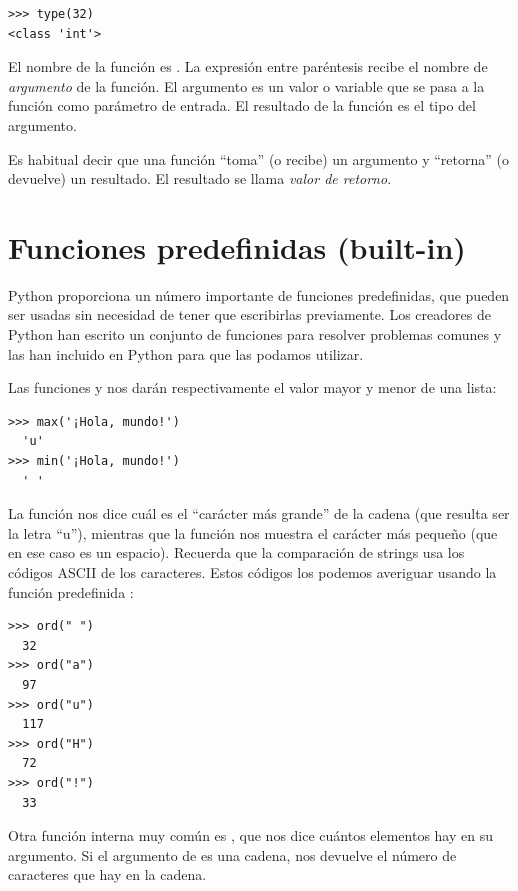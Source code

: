 \begin{Verbatim}[frame=single]
>>> type(32)
<class 'int'>
\end{Verbatim}

El nombre de la función es . La expresión entre paréntesis
recibe el nombre de \emph{argumento} de la función. El argumento es un
valor o variable que se pasa a la función como parámetro de entrada. El
resultado de la función  es el tipo del argumento.


Es habitual decir que una función ``toma'' (o recibe) un argumento y
``retorna'' (o devuelve) un resultado. El resultado se llama \emph{valor
de retorno}.

 

\section{Funciones predefinidas (built-in)}\label{funciones-predefinidad}

Python proporciona un número importante de funciones predefinidas, que
pueden ser usadas sin necesidad de tener que escribirlas previamente. Los
creadores de Python han escrito un conjunto de funciones para resolver
problemas comunes y las han incluido en Python para que las podamos
utilizar.

Las funciones  y  nos darán respectivamente el
valor mayor y menor de una lista:

\begin{Verbatim}[frame=single]
>>> max('¡Hola, mundo!')
  'u'
>>> min('¡Hola, mundo!')
  ' '
\end{Verbatim}

La función  nos dice cuál es el ``carácter más grande'' de
la cadena (que resulta ser la letra ``u''), mientras que la función
 nos muestra el carácter más pequeño (que en ese caso es un
espacio). Recuerda que la comparación de strings usa los códigos ASCII de los caracteres. Estos códigos los podemos averiguar usando la función predefinida :

\begin{Verbatim}[frame=single]
>>> ord(" ")
  32
>>> ord("a")
  97
>>> ord("u")
  117
>>> ord("H")
  72
>>> ord("!")
  33
\end{Verbatim}

Otra función interna muy común es , que nos dice cuántos
elementos hay en su argumento. Si el argumento de  es una
cadena, nos devuelve el número de caracteres que hay en la cadena.

